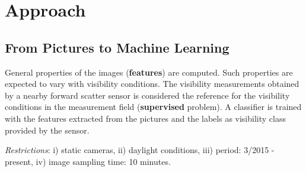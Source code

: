 \documentclass{article}
\begin{document}
\section*{Approach}
\subsection*{From Pictures to Machine Learning}
General properties of the images (\textbf{features}) are computed. Such properties are expected to vary with visibility conditions.\newline
The visibility measurements obtained by a nearby  forward scatter sensor is considered the reference for the visibility conditions in the measurement field (\textbf{supervised} problem).\newline
A classifier is trained with the features extracted from the pictures and the labels as visibility class provided by the sensor.
\vspace*{0.8cm}

\textit{Restrictions}: i) static cameras, ii) daylight conditions, iii) period: 3/2015 - present, iv) image sampling time: 10 minutes.
\end{document}

